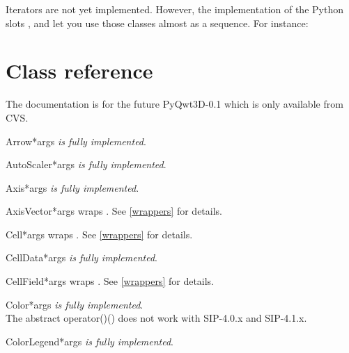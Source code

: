 \documentclass{manual}
\newcommand{\Future}{
  \begin{notice}[warning]
    The documentation is for the future PyQwt3D-0.1 which is only available
    from CVS.
  \end{notice}
}
\begin{document}
Iterators are not yet implemented. However, the implementation of the
Python slots ,  and
 let you use those classes almost as a sequence.
For instance:



\section{Class reference}

\Future{}

\begin{classdesc}{Arrow}{*args}
\emph{is fully implemented}.
\end{classdesc}

\begin{classdesc}{AutoScaler}{*args}
\emph{is fully implemented}.
\end{classdesc}

\begin{classdesc}{Axis}{*args}
\emph{is fully implemented}.
\end{classdesc}

\begin{classdesc}{AxisVector}{*args}
wraps . See \ref{wrappers} for details.
\end{classdesc}

\begin{classdesc}{Cell}{*args}
wraps . See \ref{wrappers} for details.
\end{classdesc}

\begin{classdesc}{CellData}{*args}
\emph{is fully implemented}.
\end{classdesc}

\begin{classdesc}{CellField}{*args}
wraps . See \ref{wrappers} for details.
\end{classdesc}

\begin{classdesc}{Color}{*args}
\emph{is fully implemented}.\\
The abstract operator()() does not work with SIP-4.0.x and SIP-4.1.x.
\end{classdesc}

\begin{classdesc}{ColorLegend}{*args}
\emph{is fully implemented}.
\end{classdesc}
\end{document}
